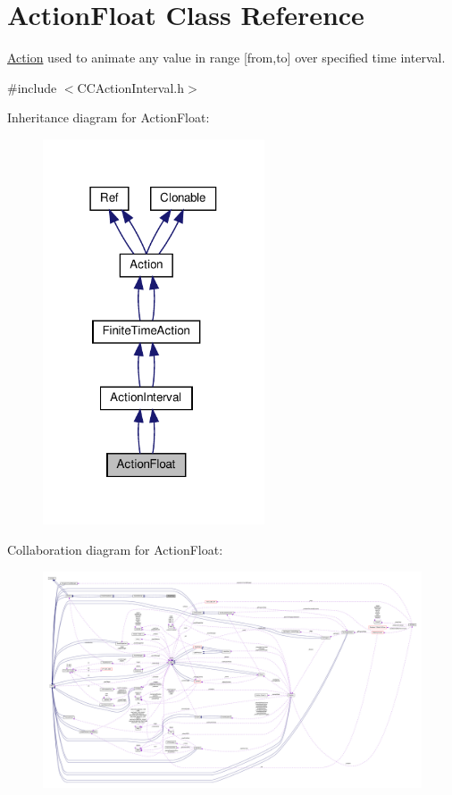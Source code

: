 \hypertarget{classActionFloat}{}\section{Action\+Float Class Reference}
\label{classActionFloat}


\hyperlink{classAction}{Action} used to animate any value in range \mbox{[}from,to\mbox{]} over specified time interval.  




{\ttfamily \#include $<$C\+C\+Action\+Interval.\+h$>$}



Inheritance diagram for Action\+Float\+:
\nopagebreak
\begin{figure}[H]
\begin{center}
\leavevmode
\includegraphics[width=186pt]{classActionFloat__inherit__graph}
\end{center}
\end{figure}


Collaboration diagram for Action\+Float\+:
\nopagebreak
\begin{figure}[H]
\begin{center}
\leavevmode
\includegraphics[width=350pt]{classActionFloat__coll__graph}
\end{center}
\end{figure}
